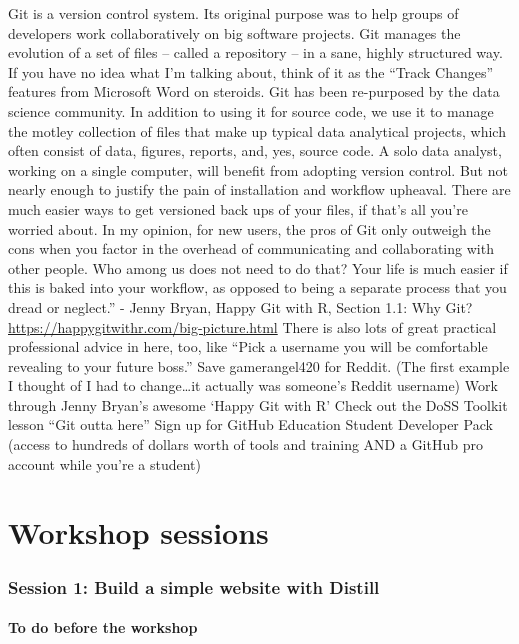 \documentclass[
]{article}
\begin{document}
Git is a version control system. Its original purpose was to help groups of developers work collaboratively on big software projects. Git manages the evolution of a set of files -- called a repository -- in a sane, highly structured way. If you have no idea what I'm talking about, think of it as the ``Track Changes'' features from Microsoft Word on steroids.
Git has been re-purposed by the data science community. In addition to using it for source code, we use it to manage the motley collection of files that make up typical data analytical projects, which often consist of data, figures, reports, and, yes, source code.
A solo data analyst, working on a single computer, will benefit from adopting version control. But not nearly enough to justify the pain of installation and workflow upheaval. There are much easier ways to get versioned back ups of your files, if that's all you're worried about.
In my opinion, for new users, the pros of Git only outweigh the cons when you factor in the overhead of communicating and collaborating with other people. Who among us does not need to do that? Your life is much easier if this is baked into your workflow, as opposed to being a separate process that you dread or neglect.'' - Jenny Bryan, Happy Git with R, Section 1.1: Why Git? \url{https://happygitwithr.com/big-picture.html}
There is also lots of great practical professional advice in here, too, like ``Pick a username you will be comfortable revealing to your future boss.'' Save gamerangel420 for Reddit. (The first example I thought of I had to change\ldots it actually was someone's Reddit username)
Work through Jenny Bryan's awesome `Happy Git with R'
Check out the DoSS Toolkit lesson ``Git outta here''
Sign up for GitHub Education Student Developer Pack (access to hundreds of dollars worth of tools and training AND a GitHub pro account while you're a student)

\hypertarget{part-workshop-sessions}{%
\part{Workshop sessions}\label{part-workshop-sessions}}

\hypertarget{sesh1}{%
\section{Session 1: Build a simple website with Distill}\label{sesh1}}

\hypertarget{s1pre}{%
\subsection{To do before the workshop}\label{s1pre}}
\end{document}
